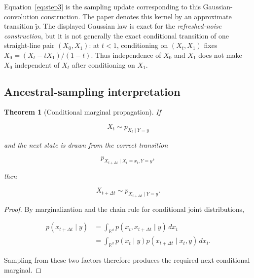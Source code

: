 \documentclass[11pt,a4paper]{article}
\newtheorem{theorem}{Theorem}
\newcommand{\Dx}{\Delta t}
\begin{document}
Equation~\eqref{eq:step3} is the sampling update corresponding
to this Gaussian-convolution construction.
The paper denotes this kernel by an approximate transition
$\widetilde p$. The displayed Gaussian law is exact for the
\emph{refreshed-noise construction}, but it is not generally the exact
conditional transition of one straight-line pair
$(X_0,X_1)$: at $t<1$, conditioning on $(X_t,X_1)$ fixes
$X_0=(X_t-tX_1)/(1-t)$. Thus independence of $X_0$ and $X_1$
does not make $X_0$ independent of $X_t$ after conditioning on $X_1$.



\subsection{Ancestral-sampling interpretation}

\begin{theorem}[Conditional marginal propagation]

If

\begin{equation}
    X_t\sim p_{X_t\mid Y=y}
\end{equation}

and the next state is drawn from the correct transition

\begin{equation}
    p_{X_{t+\Dx}\mid X_t=x_t,Y=y},
\end{equation}

then

\begin{equation}
    X_{t+\Dx}
    \sim
    p_{X_{t+\Dx}\mid Y=y}.
\end{equation}

\end{theorem}

\begin{proof}

By marginalization and the chain rule for conditional joint distributions,

\begin{align}
    p(x_{t+\Dx}\mid y)
    &=
    \int_{\mathbb R^d}
    p(x_t,x_{t+\Dx}\mid y)
    \,dx_t
    \\
    &=
    \int_{\mathbb R^d}
    p(x_t\mid y)
    p(x_{t+\Dx}\mid x_t,y)
    \,dx_t.
\end{align}

Sampling from these two factors therefore produces the required
next conditional marginal.

\end{proof}
\end{document}
